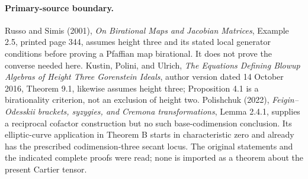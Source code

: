 \paragraph{Primary-source boundary.}
Russo and Simis (2001), \emph{On Birational Maps and Jacobian Matrices},
Example 2.5, printed page 344, assumes height three and its stated
local generator conditions before proving a Pfaffian map birational.
It does not prove the converse needed here.
Kustin, Polini, and Ulrich, \emph{The Equations Defining Blowup Algebras
of Height Three Gorenstein Ideals}, author version dated 14 October
2016, Theorem 9.1, likewise assumes height three; Proposition 4.1 is
a birationality criterion, not an exclusion of height two.
Polishchuk (2022), \emph{Feigin--Odesskii brackets, syzygies, and
Cremona transformations}, Lemma 2.4.1, supplies a reciprocal
cofactor construction but no such base-codimension conclusion.
Its elliptic-curve application in Theorem B starts in characteristic
zero and already has the prescribed codimension-three secant locus.
The original statements and the indicated complete proofs were read;
none is imported as a theorem about the present Cartier tensor.
